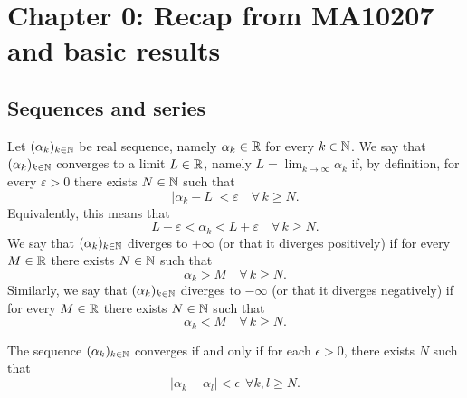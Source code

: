 \section*{Chapter 0: Recap from MA10207 and basic results}

\subsection{Sequences and series}

\begin{definition}
Let $(\alpha_k)_{k\in \mathbb{N}}$ be real sequence, namely $\alpha_k\in \mathbb{R}$ for every $k\in \mathbb{N}$. We say that $(\alpha_k)_{k\in \mathbb{N}}$ converges to a limit $L\in \mathbb{R}$, namely $L=\lim_{k\to \infty} \alpha_k$ if, by definition, for every $\varepsilon>0$ there exists $N\in \mathbb{N}$ such that 
$$
|\alpha_k  - L|< \varepsilon \quad \forall\, k\geq N.
$$
Equivalently, this means that 
\begin{equation}\label{e:ls}
L-\varepsilon< \alpha_k  < L+\varepsilon \quad \forall\, k\geq N.
\end{equation}
We say that $(\alpha_k)_{k\in \mathbb{N}}$ diverges to $+\infty$ (or that it diverges positively) if for every $M\in \mathbb{R}$ there exists $N\in \mathbb{N}$ such that 
$$
\alpha_k > M \quad \forall\, k\geq N.
$$
Similarly, we say that $(\alpha_k)_{k\in \mathbb{N}}$ diverges to $-\infty$ (or that it diverges negatively) if for every $M\in \mathbb{R}$ there exists $N\in \mathbb{N}$ such that 
$$
\alpha_k < M \quad \forall\, k\geq N.
$$
\bigskip
\begin{proposition}\label{cauchycritseq}
	The sequence $(\alpha_k)_{k\in \mathbb{N}}$ converges if and only if for each $\epsilon >0$, there exists $N$ such that
	$$
	|\alpha_k -\alpha_l| < \epsilon\ \ \forall k,l \geq N.
	$$
\end{proposition}


\end{definition}

